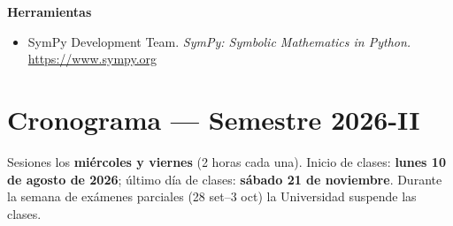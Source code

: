 \documentclass[11pt]{article}
\begin{document}
\textbf{Herramientas}
\begin{itemize}
\item SymPy Development Team. \emph{SymPy: Symbolic Mathematics in Python.} \url{https://www.sympy.org}
\end{itemize}

\section{Cronograma --- Semestre 2026-II}

Sesiones los \textbf{mi\'ercoles y viernes} (2 horas cada una). Inicio de clases: \textbf{lunes 10 de agosto de 2026}; \'ultimo d\'ia de clases: \textbf{s\'abado 21 de noviembre}. Durante la semana de ex\'amenes parciales (28 set--3 oct) la Universidad suspende las clases.
\end{document}
